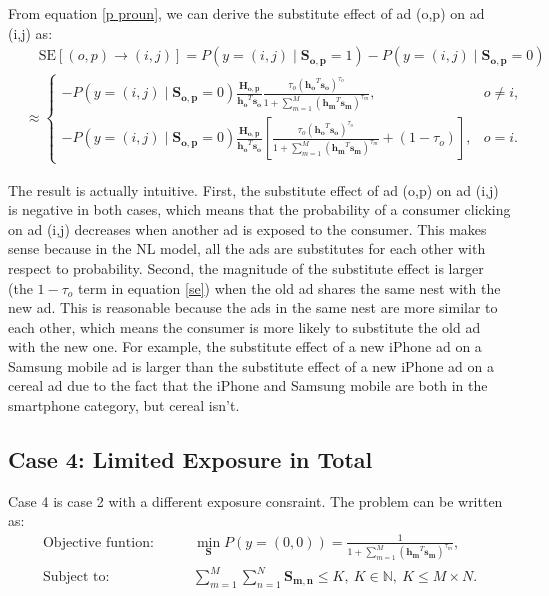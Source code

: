 \documentclass[12pt]{article}
\theoremstyle{definition}
\newcommand{\matr}[1]{\mathbf{#1}} %
\begin{document}
\begin{sloppypar}
From equation \ref{p proun}, we can derive the substitute effect of ad (o,p) on ad (i,j) as:
\begin{equation}\label{se}
\begin{aligned}
    &\quad \mathrm{SE}[(o,p) \rightarrow (i,j)] = P(y=(i,j) \mid \matr{S_{o,p}}=1) - P(y=(i,j) \mid \matr{S_{o,p}}=0)  \\
    &\approx 
    \begin{cases}
        -P(y=(i,j) \mid \matr{S_{o,p}} = 0)\frac{\matr{H_{o,p}}}{\matr{h_o}^T \matr{s_o}}\frac{\tau_o(\matr{h_o}^T \matr{s_o})^{\tau_o}}{1+\sum_{m=1}^{M} (\matr{h_m}^T\matr{s_m})^{\tau_m}}, &o \neq i,\\
        -P(y=(i,j) \mid \matr{S_{o,p}} = 0)\frac{\matr{H_{o,p}}}{\matr{h_o}^T \matr{s_o}}[\frac{\tau_o(\matr{h_o}^T\matr{s_o})^{\tau_o}}{1+\sum_{m=1}^{M} (\matr{h_m}^T\matr{s_m})^{\tau_m}}+(1-\tau_o)], &o = i.
    \end{cases}
\end{aligned}
\end{equation}

The result is actually intuitive. First, the substitute effect of ad (o,p) on ad (i,j) is negative in both cases, which means that the probability of a consumer clicking on ad (i,j) decreases when another ad is exposed to the consumer. This makes sense because in the NL model, all the ads are substitutes for each other with respect to probability. Second, the magnitude of the substitute effect is larger (the $1-\tau_o$ term in equation \ref{se}) when the old ad shares the same nest with the new ad. This is reasonable because the ads in the same nest are more similar to each other, which means the consumer is more likely to substitute the old ad with the new one. For example, the substitute effect of a new iPhone ad on a Samsung mobile ad is larger than the substitute effect of a new iPhone ad on a cereal ad due to the fact that the iPhone and Samsung mobile are both in the smartphone category, but cereal isn't.

\subsection{Case 4: Limited Exposure in Total}
Case 4 is case 2 with a different exposure consraint. The problem can be written as:
\begin{align} \label{case4}
    \text{Objective funtion:} \qquad &\min_{\matr{S}} P(y=(0,0)) = \frac{1}{1+\sum_{m=1}^{M}(\matr{h_m}^T \matr{s_m})^{\tau_m}},\nonumber \\
    \text{Subject to:} \qquad &\sum_{m=1}^{M}\sum_{n=1}^{N}\matr{S_{m,n}} \leq K,\ K \in \mathbb{N},\ K \leq M \times N.
\end{align}


\end{sloppypar}
\end{document}
